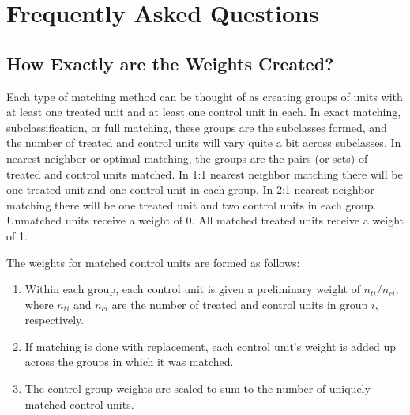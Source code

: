 \documentclass[oneside,letterpaper,12pt]{book}
\newcommand{\MatchIt}{\textsc{MatchIt}}
\begin{document}

\section{Frequently Asked Questions}

%

\subsection{How Exactly are the Weights Created?}
\label{subsec:weights}

Each type of matching method can be thought of as creating groups of
units with at least one treated unit and at least one control unit in
each.  In exact matching, subclassification, or full matching, these
groups are the subclasses formed, and the number of treated and
control units will vary quite a bit across subclasses.  In nearest
neighbor or optimal matching, the groups are the pairs (or sets) of
treated and control units matched.  In 1:1 nearest neighbor matching
there will be one treated unit and one control unit in each group.  In
2:1 nearest neighbor matching there will be one treated unit and two
control units in each group.  Unmatched units receive a weight of 0.
All matched treated units receive a weight of 1.

The weights for matched control units are formed as follows:
\begin{enumerate}
\item Within each group, each control unit is given a preliminary
  weight of $n_{ti}/n_{ci}$, where $n_{ti}$ and $n_{ci}$ are the
  number of treated and control units in group $i$, respectively.
\item If matching is done with replacement, each control unit's weight
  is added up across the groups in which it was matched.
\item The control group weights are scaled to sum to the number of
  uniquely matched control units.
\end{enumerate}
\end{document}
